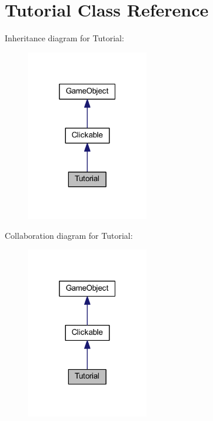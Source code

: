 \hypertarget{class_tutorial}{\section{Tutorial Class Reference}
\label{class_tutorial}
}


Inheritance diagram for Tutorial\+:\nopagebreak
\begin{figure}[H]
\begin{center}
\leavevmode
\includegraphics[width=151pt]{class_tutorial__inherit__graph}
\end{center}
\end{figure}


Collaboration diagram for Tutorial\+:\nopagebreak
\begin{figure}[H]
\begin{center}
\leavevmode
\includegraphics[width=151pt]{class_tutorial__coll__graph}
\end{center}
\end{figure}

